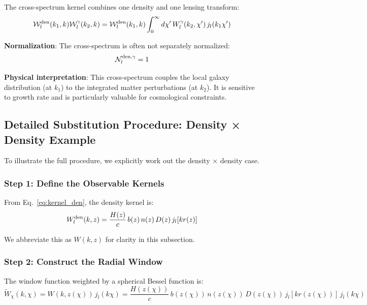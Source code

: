 The cross-spectrum kernel combines one density and one lensing transform:
\begin{equation}
\label{eq:window_den_gam_fb}
\mathcal{W}_l^{\rm den}(k_1, k) \mathcal{W}_l^\gamma(k_2, k) = \mathcal{W}_l^{\rm den}(k_1, k) \int_0^\infty d\chi' \, W_l^\gamma(k_2, \chi') \, j_l(k_1 \chi')
\end{equation}

\textbf{Normalization}: The cross-spectrum is often not separately normalized:
\begin{equation}
\mathcal{N}_l^{\rm den,\gamma} = 1
\end{equation}

\textbf{Physical interpretation}: This cross-spectrum couples the local galaxy distribution (at $k_1$) to the integrated matter perturbations (at $k_2$). It is sensitive to growth rate and is particularly valuable for cosmological constraints.

\subsection{Detailed Substitution Procedure: Density × Density Example}

To illustrate the full procedure, we explicitly work out the density × density case.

\subsubsection{Step 1: Define the Observable Kernels}

From Eq.~\ref{eq:kernel_den}, the density kernel is:
\begin{equation}
W^{\rm den}_l(k, z) = \frac{H(z)}{c} \, b(z) \, n(z) \, D(z) \, j_l[k r(z)]
\end{equation}

We abbreviate this as $W(k, z)$ for clarity in this subsection.

\subsubsection{Step 2: Construct the Radial Window}

The window function weighted by a spherical Bessel function is:
\begin{equation}
\widetilde{W}_\chi(k, \chi) = W(k, z(\chi)) \, j_l(k \chi) = \frac{H(z(\chi))}{c} \, b(z(\chi)) \, n(z(\chi)) \, D(z(\chi)) \, j_l[k r(z(\chi))] \, j_l(k \chi)
\end{equation}

